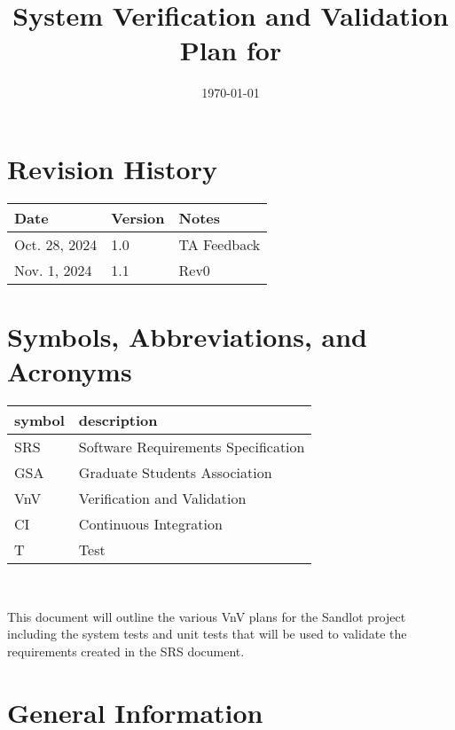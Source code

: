 \documentclass[12pt, titlepage]{article}
\begin{document}
\title{System Verification and Validation Plan for \progname{}} 
\author{\authname}
\date{\today}
	
\maketitle


\section*{Revision History}

\begin{tabularx}{\textwidth}{p{3cm}p{2cm}X}
\toprule {\bf Date} & {\bf Version} & {\bf Notes}\\
\midrule
Oct. 28, 2024 & 1.0 & TA Feedback\\
Nov. 1, 2024 & 1.1 & Rev0\\
\bottomrule
\end{tabularx}

\newpage

\tableofcontents

\newpage

\section{Symbols, Abbreviations, and Acronyms}

\renewcommand{\arraystretch}{1.2}
\begin{tabular}{l l} 
  \toprule		
  \textbf{symbol} & \textbf{description}\\
  \midrule 
  SRS & Software Requirements Specification\\
  GSA & Graduate Students Association\\
  VnV & Verification and Validation\\
  CI & Continuous Integration\\
  T & Test\\
  \bottomrule
\end{tabular}\\

\newpage


This document will outline the various VnV plans for the Sandlot project including
the system tests and unit tests that will be used to validate the requirements
created in the SRS document.

\section{General Information}
\end{document}

